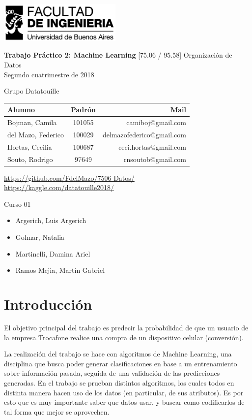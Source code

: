 \documentclass[a4paper]{article}
\makeatletter
\newcommand{\materia}{[75.06 / 95.58] Organización de Datos}
\newcommand{\trabajo}{Trabajo Práctico 2: Machine Learning}
\newcommand{\cuatrimestre}{Segundo cuatrimestre de 2018}
\newcommand{\grupo}{Grupo Datatouille}
\newcommand{\repo}{https://github.com/FdelMazo/7506-Datos/}
\newcommand{\kernel}{https://kaggle.com/datatouille2018/}
\newcommand{\alumnos}{
    Bojman, Camila & 101055 &  camiboj@gmail.com\\
    del Mazo, Federico & 100029 & delmazofederico@gmail.com\\
    Hortas, Cecilia & 100687 & ceci.hortas@gmail.com\\
    Souto, Rodrigo & 97649 & rnsoutob@gmail.com\\
}
\newcommand{\curso}{Curso 01}
\newcommand{\docentes}{
    \item Argerich, Luis Argerich
    \item Golmar, Natalia
    \item Martinelli, Damina Ariel
    \item Ramos Mejia, Martín Gabriel
}
\makeatother
\begin{document}

\begin{titlepage}
	\hfill\includegraphics[width=6cm]{fiuba.jpg}
    \begin{center}
    \vfill
    \Huge \textbf{\trabajo}
    \vskip2cm
    \Large \materia\\
    \cuatrimestre
    \vfill
    \begin{flushleft} 
    \grupo
    \end{flushleft}
    \begin{tabular}{|l|c|r|}
	\hline
	Alumno & Padrón & Mail\\
	\hline \hline
    \alumnos
	\hline
	\end{tabular}
    \begin{flushleft} 
    \large{\url{\repo}} \\
    \large{\url{\kernel}} \\
    \end{flushleft}
    \vskip1cm
    \end{center}
    \curso
    \begin{itemize}
        \docentes
    \end{itemize}
\end{titlepage}
\tableofcontents
\newpage
{}
\setcounter{page}{1}

\section{Introducción}

El objetivo principal del trabajo es predecir la probabilidad de que un usuario de la empresa Trocafone realice una compra de un dispositivo celular (conversión). 

La realización del trabajo se hace con algoritmos de Machine Learning, una disciplina que busca poder generar clasificaciones en base a un entrenamiento sobre información pasada, seguida de una validación de las predicciones generadas. En el trabajo se prueban distintos algoritmos, los cuales todos en distinta manera hacen uso de los datos (en particular, de sus atributos). Es por esto que es muy importante saber que datos usar, y buscar como codificarlos de tal forma que mejor se aprovechen.
\end{document}
